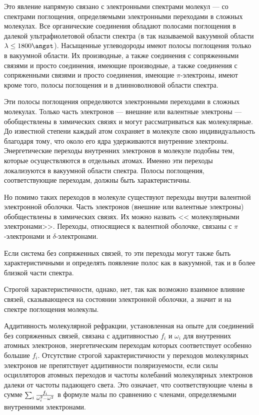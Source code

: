  \vskip 2mm Это явление
напрямую связано с электронными спектрами молекул --- со спектрами
поглощения, определяемыми электронными переходами в сложных
молекулах. Все органические соединения обладают полосами
поглощения в далекой ультрафиолетовой области спектра (в так
называемой вакуумной области $\lambda\leq1800\angst$). Насыщенные
углеводороды имеют полосы поглощения только в вакуумной области.
Их производные, а также соединения с сопряженными связями и просто
соединения, имеющие производные, а также соединения с сопряженными
связями и просто соединения, имеющие $\pi$-электроны, имеют кроме
того, полосы поглощения и в длинноволновой области спектра.

Эти полосы поглощения определяются электронными переходами в
сложных молекулах. Только часть электронов --- внешние или
валентные электроны --- обобществлены в химических связях и могут
рассматриваться как молекулярные. До известной степени каждый атом
сохраняет в молекуле свою индивидуальность благодаря тому, что
около его ядра удерживаются внутренние электроны. Энергетические
переходы внутренних электронов в молекуле подобны тем, которые
осуществляются в отдельных атомах. Именно эти переходы
локализуются в вакуумной области спектра. Полосы поглощения,
соответствующие переходам, должны быть характеристичны.

Но помимо таких переходов в молекуле существуют переходы внутри
валентной электронной оболочки. Часть электронов (внешние или
валентные электроны) обобществлены в химических связях. Их можно
назвать << молекулярными электронами>>. Переходы, относящиеся к
валентной оболочке, связаны с $\pi$-электронами и
$\delta$-электронами.

Если система без сопряженных связей, то эти переходы могут также
быть характеристичными и определять появление полос как в
вакуумной, так и в более близкой части спектра.

Строгой характеристичности, однако, нет, так как возможно взаимное
влияние связей, сказывающееся на состоянии электронной оболочки, а
значит и на спектре поглощения молекулы.

Аддитивность молекулярной рефракции, установленная на опыте для
соединений без сопряженных связей, связана с аддитивностью $f_i$ и
$\omega_i$ для внутренних атомных электронов, энергетическим
переходам которых соответствует особенно большие $f_i$. Отсутствие
строгой характеристичности у переходов молекулярных электронов не
препятствует аддитивности поляризуемости, если силы осцилляторов
атомных переходов и частоты колебаний молекулярных электронов
далеки от частоты падающего света. Это означает, что
соответствующие члены в сумме $\sum_{i}{f_i\over
\omega_i^2-\omega^2}$ в формуле  малы по сравнению с
членами, определяемыми внутренними электронами.

